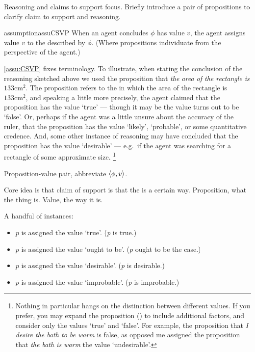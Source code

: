 \begin{note}
  Reasoning and claims to support focus.
  Briefly introduce a pair of propositions to clarify claim to support and reasoning.

  \begin{restatable}{assumption}{assuCSVP}
    \label{assu:CSVP}
    When an agent concludes \(\phi\) has value \(v\), the agent assigns value \(v\) to the  described by \(\phi\).
    (Where propositions individuate  from the perspective of the agent.)
  \end{restatable}

  \autoref{assu:CSVP} fixes terminology.
  To illustrate, when stating the conclusion of the reasoning sketched above we used the proposition that \emph{the area of the rectangle is \(133\text{cm}^{2}\)}.
  The proposition refers to the \world{} in which the area of the rectangle is \(133\text{cm}^{2}\), and speaking a little more precisely, the agent claimed that the proposition has the value `true' --- though it may be the value turns out to be `false'.
  Or, perhaps if the agent was a little unsure about the accuracy of the ruler, that the proposition has the value `likely', `probable', or some quantitative credence.
  And, some other instance of reasoning may have concluded that the proposition has the value `desirable' --- e.g.\ if the agent was searching for a rectangle of some approximate size.%
  \footnote{
    Nothing in particular hangs on the distinction between different values.
    If you prefer, you may expand the proposition (\world{}) to include additional factors, and consider only the values `true' and `false'.
    For example, the proposition that \emph{I desire the bath to be warm} is false, as opposed me assigned the proposition that \emph{the bath is warm} the value `undesirable'.
  }
\end{note}

\begin{note}[Notation]
  \begin{notation}
    Proposition-value pair, abbreviate \(\langle \phi, v \rangle\).
  \end{notation}
\end{note}

\begin{note}
  Core idea is that claim of support is that the \world{} is a certain way.
  Proposition, what the thing is.
  Value, the way it is.

  A handful of instances:
  \begin{itemize}
  \item \(p\) is assigned the value `true'. \hfill (\emph{p} is true.)
  \item \(p\) is assigned the value `ought to be'. \hfill (\emph{p} ought to be the case.)
  \item \(p\) is assigned the value `desirable'. \hfill (\emph{p} is desirable.)
  \item \(p\) is assigned the value `improbable'. \hfill (\emph{p} is improbable.)
  \end{itemize}
\end{note}

